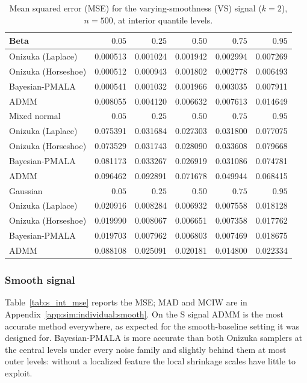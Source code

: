 \begin{table}[!htbp]
\centering
\small
\caption{Mean squared error (MSE) for the varying-smoothness (VS) signal ($k=2$), $n=500$, at interior quantile levels.}
\label{tab:vs_int_mse}
\begin{tabular}{lrrrrr}
\toprule
Beta & $0.05$ & $0.25$ & $0.50$ & $0.75$ & $0.95$ \\
\midrule
Onizuka (Laplace) & 0.000513 & 0.001024 & 0.001942 & 0.002994 & 0.007269 \\
Onizuka (Horseshoe) & 0.000512 & 0.000943 & 0.001802 & 0.002778 & 0.006493 \\
Bayesian-PMALA & 0.000541 & 0.001032 & 0.001966 & 0.003035 & 0.007911 \\
ADMM & 0.008055 & 0.004120 & 0.006632 & 0.007613 & 0.014649 \\
\midrule
Mixed normal & $0.05$ & $0.25$ & $0.50$ & $0.75$ & $0.95$ \\
\midrule
Onizuka (Laplace) & 0.075391 & 0.031684 & 0.027303 & 0.031800 & 0.077075 \\
Onizuka (Horseshoe) & 0.073529 & 0.031743 & 0.028090 & 0.033608 & 0.079668 \\
Bayesian-PMALA & 0.081173 & 0.033267 & 0.026919 & 0.031086 & 0.074781 \\
ADMM & 0.096462 & 0.092891 & 0.071678 & 0.049944 & 0.068415 \\
\midrule
Gaussian & $0.05$ & $0.25$ & $0.50$ & $0.75$ & $0.95$ \\
\midrule
Onizuka (Laplace) & 0.020916 & 0.008284 & 0.006932 & 0.007558 & 0.018128 \\
Onizuka (Horseshoe) & 0.019990 & 0.008067 & 0.006651 & 0.007358 & 0.017762 \\
Bayesian-PMALA & 0.019703 & 0.007962 & 0.006803 & 0.007469 & 0.018675 \\
ADMM & 0.088108 & 0.025091 & 0.020181 & 0.014800 & 0.022334 \\
\bottomrule
\end{tabular}
\end{table}

\subsubsection{Smooth signal}
\label{sec:sim:ind:smooth}

Table~\ref{tab:s_int_mse} reports the MSE; MAD and MCIW are in Appendix~\ref{app:sim:individual:smooth}. On the S signal ADMM is the most accurate method everywhere, as expected for the smooth-baseline setting it was designed for. Bayesian-PMALA is more accurate than both Onizuka samplers at the central levels under every noise family and slightly behind them at most outer levels: without a localized feature the local shrinkage scales have little to exploit.

